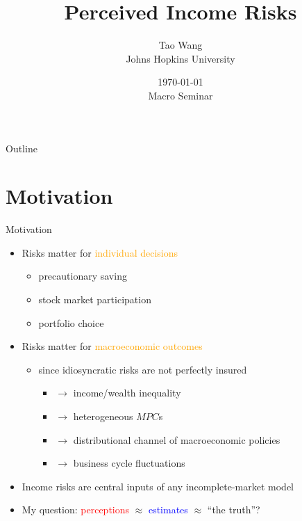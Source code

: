 \documentclass{beamer}
\title{Perceived Income Risks}
\author{Tao Wang \\ Johns Hopkins University}
\date{\today \\
	Macro Seminar}
\begin{document}
	

\begin{frame}
	\titlepage
\end{frame}
\begin{frame}{Outline}
	\tableofcontents
\end{frame}


\section{Motivation}


\begin{frame}{Motivation}
	\begin{itemize}
		\item Risks matter for \textcolor{orange}{individual decisions}
		\begin{itemize}
			\item precautionary saving 
			\item stock market participation
			\item portfolio choice 
		\end{itemize} 
		\item Risks matter for \textcolor{orange}{macroeconomic outcomes}
		\begin{itemize}
			\item since idiosyncratic risks are not perfectly insured 
			\begin{itemize}
				\item $\rightarrow$ income/wealth inequality 
				\item $\rightarrow$ heterogeneous $MPC$s
				\item $\rightarrow$ distributional channel of macroeconomic policies 
				\item $\rightarrow$ business cycle fluctuations
			\end{itemize}
		\end{itemize}  %
	\item Income risks are central inputs of any incomplete-market model   
		\item My question:  \textcolor{red}{perceptions} $\approx$ \textcolor{blue}{estimates}  $\approx$  ``the truth''?  %
	\end{itemize}
\end{frame}
\end{document}
